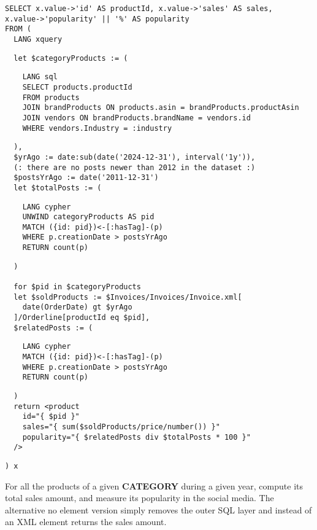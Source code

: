 \begin{listing}[!ht]
\begin{verbatim}
SELECT x.value->'id' AS productId, x.value->'sales' AS sales,
x.value->'popularity' || '%' AS popularity
FROM (
  LANG xquery
\end{verbatim}
\nestedMintedVspace
\begin{verbatim}
  let $categoryProducts := (
\end{verbatim}
\nestedMintedVspace
\begin{verbatim}
    LANG sql
    SELECT products.productId
    FROM products
    JOIN brandProducts ON products.asin = brandProducts.productAsin
    JOIN vendors ON brandProducts.brandName = vendors.id
    WHERE vendors.Industry = :industry
\end{verbatim}
\nestedMintedVspace
\begin{verbatim}
  ),
  $yrAgo := date:sub(date('2024-12-31'), interval('1y')),
  (: there are no posts newer than 2012 in the dataset :)
  $postsYrAgo := date('2011-12-31')
  let $totalPosts := (
\end{verbatim}
\nestedMintedVspace
\begin{verbatim}
    LANG cypher
    UNWIND categoryProducts AS pid
    MATCH ({id: pid})<-[:hasTag]-(p)
    WHERE p.creationDate > postsYrAgo
    RETURN count(p)
\end{verbatim}
\nestedMintedVspace
\begin{verbatim}
  )

  for $pid in $categoryProducts
  let $soldProducts := $Invoices/Invoices/Invoice.xml[
    date(OrderDate) gt $yrAgo
  ]/Orderline[productId eq $pid],
  $relatedPosts := (
\end{verbatim}
\nestedMintedVspace
\begin{verbatim}
    LANG cypher
    MATCH ({id: pid})<-[:hasTag]-(p)
    WHERE p.creationDate > postsYrAgo
    RETURN count(p)
\end{verbatim}
\nestedMintedVspace
\begin{verbatim}
  )
  return <product
    id="{ $pid }"
    sales="{ sum($soldProducts/price/number()) }"
    popularity="{ $relatedPosts div $totalPosts * 100 }"
  />
\end{verbatim}
\nestedMintedVspace
\begin{verbatim}
) x
\end{verbatim}
\caption{For all the products of a given \textbf{CATEGORY} during a given year, compute its total sales amount, and measure its popularity in the social media. The alternative no element version simply removes the outer SQL layer and instead of an XML element returns the sales amount.}
\end{listing}

